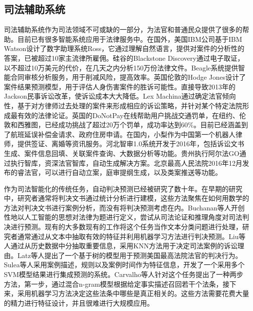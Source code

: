 \subsection{司法辅助系统}

司法辅助系统作为司法领域不可或缺的一部分，为法官和普通民众提供了很多的帮助。目前已有很多智能系统应用于法律服务中。在国外，美国IBM公司基于IBM Watson设计了数字助理系统Ross，它通过理解自然语言，提供对案件的分析性的答案，已被超过10家主流律所雇佣。硅谷的Blackstone Discovery通过电子取证，以不超过10万美元的代价，在几天之内分析150万份法律文件。Beagle系统提供智能合同审核分析服务，用于削减风险，提高效率。英国伦敦的Hodge Jones设计了案件结果预测模型，用于评估人身伤害案件的胜诉可能性。直接导致2013年的Jackson民事诉讼改革，使诉讼成本大大降低。Lex Machina通过确定法官倾向性，基于对方律师过去处理的案件来形成相应的诉讼策略，并针对某个特定法院形成最有效的法律论证。英国的DoNotPay在线帮助用户挑战交通罚单，在纽约、伦敦和西雅图，已经成功挑战了超过20万个罚单，成功率达到60$\%$。目前已经涵盖到了航班延误补偿金请求、政府住房申请。在国内，小梨作为中国第一个机器人律师，提供签证、离婚等资讯服务。河北智审1.0系统开发于2016年，包括诉讼文书生成、案件信息回填、关联案件查询、大数据分析等功能。贵州执行阿尔法GO通过执行智库，资深法官智库，自动生成解决方案。北京最高人民法院2016年12月发布的睿法官，可以进行自动立案，庭审提纲生成，以及类案推送等功能。

作为司法智能化的传统任务，自动判决预测已经被研究了数十年。在早期的研究中，研究者通常将判决文书通过统计分析进行建模\cite{LiuC03, kort1957predicting, nagel1963applying, ulmer1963quantitative, keown1980mathematical}，这些方法聚焦在如何用数学的方法对判决文书进行案例分析，而没有将判决预测考虑在内。Buchanan等人开创性地以人工智能的思想对法律为题进行定义，尝试从司法论证和推理角度对司法判决进行预测\cite{buchanan1970some}。现有的大多数现有的工作将这个任务当作文本分类问题进行处理，研究者通常通过从文本中抽取有效的特征并利用机器学习方法进行判决预测\cite{kim2014legal, AletrasTPL16, liu2015predicting}。Liu等人通过从历史数据中分抽取重要信息，采用KNN方法用于决定司法案例的诉讼理由\cite{LiuCH04}。Latz等人提出了一个基于树的模型用于预测美国最高法院法官的判决行为\cite{KatzBB14}。Sulea等人采用案例描述，规则以及案例时间作为特征信息，开发了一个采用多个SVM模型结果进行集成预测的系统\cite{Sulea2017Exploring}。Carvalho等人针对这个任务提出了一种两步方法，第一步，通过混合n-gram模型根据给定事实描述召回若干个法条，接下来，采用机器学习方法决定这些法条中哪些是真正相关的\cite{carvalho2015lexical}。这些方法需要花费大量的精力进行特征设计，并且很难进行大规模应用。

